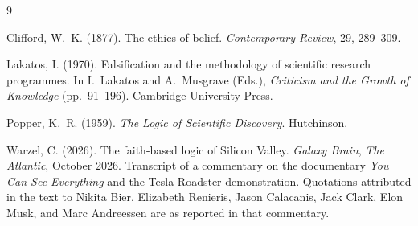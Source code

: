 \documentclass[11pt]{article}
\theoremstyle{plain}
\theoremstyle{definition}
\theoremstyle{remark}
\begin{document}
\begin{thebibliography}{9}

Clifford, W.~K. (1877). The ethics of belief. \textit{Contemporary Review}, 29, 289--309.

Lakatos, I. (1970). Falsification and the methodology of scientific research programmes. In I.~Lakatos and A.~Musgrave (Eds.), \textit{Criticism and the Growth of Knowledge} (pp.~91--196). Cambridge University Press.

Popper, K.~R. (1959). \textit{The Logic of Scientific Discovery}. Hutchinson.

Warzel, C. (2026). The faith-based logic of Silicon Valley. \textit{Galaxy Brain}, \textit{The Atlantic}, October 2026. Transcript of a commentary on the documentary \textit{You Can See Everything} and the Tesla Roadster demonstration. Quotations attributed in the text to Nikita Bier, Elizabeth Renieris, Jason Calacanis, Jack Clark, Elon Musk, and Marc Andreessen are as reported in that commentary.

\end{thebibliography}
\end{document}
